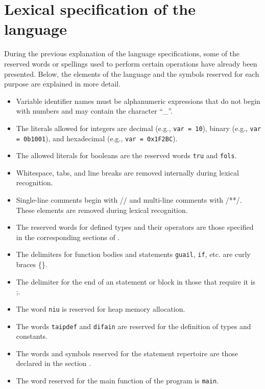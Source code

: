 \documentclass[10pt,a4paper]{article}
\begin{document}
\section{Lexical specification of the language}\label{sec:Especificación léxica del lenguaje}
During the previous explanation of the language specifications, some of the reserved words or spellings used to perform certain operations have already been presented. Below, the elements of the language and the symbols reserved for each purpose are explained in more detail.

\begin{itemize}
    \item Variable identifier names must be alphanumeric expressions that do not begin with numbers and may contain the character ``\_''.
    \item The literals allowed for integers are decimal (e.g., \texttt{var = 10}), binary (e.g., \texttt{var = 0b1001}), and hexadecimal (e.g., \texttt{var = 0x1F2BC}).
    \item The allowed literals for booleans are the reserved words \texttt{tru} and \texttt{fols}.
    \item Whitespace, tabs, and line breaks are removed internally during lexical recognition.
    \item Single-line comments begin with // and multi-line comments with /**/. These elements are removed during lexical recognition.
    \item The reserved words for defined types and their operators are those specified in the corresponding sections of .
    \item The delimiters for function bodies and statements \texttt{guail}, \texttt{if}, etc. are curly braces \{\}.
    \item The delimiter for the end of an statement or block in those that require it is ;.
    \item The word \texttt{niu} is reserved for heap memory allocation.
    \item The words \texttt{taipdef} and \texttt{difain} are reserved for the definition of types and constants.
    \item The words and symbols reserved for the statement repertoire are those declared in the section .
    \item The word reserved for the main function of the program is \texttt{main}.
\end{itemize}
\end{document}
